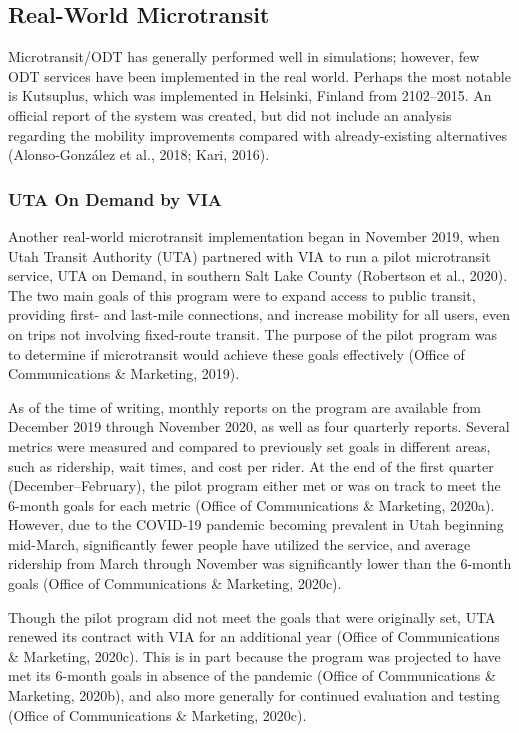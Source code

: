 \documentclass[
]{article}
\begin{document}
\hypertarget{real-world-microtransit}{%
\subsection{Real-World Microtransit}\label{real-world-microtransit}}

Microtransit/ODT has generally performed well in simulations; however, few ODT services have been implemented in the real world. Perhaps the most notable is Kutsuplus, which was implemented in Helsinki, Finland from 2102--2015. An official report of the system was created, but did not include an analysis regarding the mobility improvements compared with already-existing alternatives (Alonso-González et al., 2018; Kari, 2016).

\hypertarget{uta-on-demand-by-via}{%
\subsubsection{UTA On Demand by VIA}\label{uta-on-demand-by-via}}

Another real-world microtransit implementation began in November 2019, when Utah Transit Authority (UTA) partnered with VIA to run a pilot microtransit service, UTA on Demand, in southern Salt Lake County (Robertson et al., 2020). The two main goals of this program were to expand access to public transit, providing first- and last-mile connections, and increase mobility for all users, even on trips not involving fixed-route transit. The purpose of the pilot program was to determine if microtransit would achieve these goals effectively (Office of Communications \& Marketing, 2019).

As of the time of writing, monthly reports on the program are available from December 2019 through November 2020, as well as four quarterly reports. Several metrics were measured and compared to previously set goals in different areas, such as ridership, wait times, and cost per rider. At the end of the first quarter (December--February), the pilot program either met or was on track to meet the 6-month goals for each metric (Office of Communications \& Marketing, 2020a). However, due to the COVID-19 pandemic becoming prevalent in Utah beginning mid-March, significantly fewer people have utilized the service, and average ridership from March through November was significantly lower than the 6-month goals (Office of Communications \& Marketing, 2020c).

Though the pilot program did not meet the goals that were originally set, UTA renewed its contract with VIA for an additional year (Office of Communications \& Marketing, 2020c). This is in part because the program was projected to have met its 6-month goals in absence of the pandemic (Office of Communications \& Marketing, 2020b), and also more generally for continued evaluation and testing (Office of Communications \& Marketing, 2020c).
\end{document}

